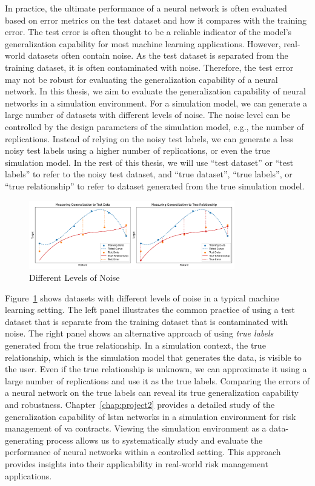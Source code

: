 In practice, the ultimate performance of a neural network is often evaluated based on error metrics on the test dataset and how it compares with the training error.
The test error is often thought to be a reliable indicator of the model's generalization capability for most machine learning applications.
However, real-world datasets often contain noise.
As the test dataset is separated from the training dataset, it is often contaminated with noise.
Therefore, the test error may not be robust for evaluating the generalization capability of a neural network.
In this thesis, we aim to evaluate the generalization capability of neural networks in a simulation environment.
For a simulation model, we can generate a large number of datasets with different levels of noise.
The noise level can be controlled by the design parameters of the simulation model, e.g., the number of replications.
Instead of relying on the noisy test labels, we can generate a less noisy test labels using a higher number of replications, or even the true simulation model.
In the rest of this thesis, we will use ``test dataset'' or ``test labels'' to refer to the noisy test dataset, and ``true dataset'', ``true labels'', or ``true relationship'' to refer to dataset generated from the true simulation model.

\begin{figure}[ht!] 
    \centering
    \includegraphics[width=0.8\textwidth]{./project2/figures/datasets.png}
    \caption{Different Levels of Noise}
    \label{fig:datasets}
\end{figure}

Figure~\ref{fig:datasets} shows datasets with different levels of noise in a typical machine learning setting.
The left panel illustrates the common practice of using a test dataset that is separate from the training dataset that is contaminated with noise.
The right panel shows an alternative approach of using \textit{true labels} generated from the true relationship.
In a simulation context, the true relationship, which is the simulation model that generates the data, is visible to the user.
Even if the true relationship is unknown, we can approximate it using a large number of replications and use it as the true labels.
Comparing the errors of a neural network on the true labels can reveal its true generalization capability and robustness.
Chapter~\ref{chap:project2} provides a detailed study of the generalization capability of \gls{lstm} networks in a simulation environment for risk management of \gls{va} contracts.
Viewing the simulation environment as a data-generating process allows us to systematically study and evaluate the performance of neural networks within a controlled setting.
This approach provides insights into their applicability in real-world risk management applications.

